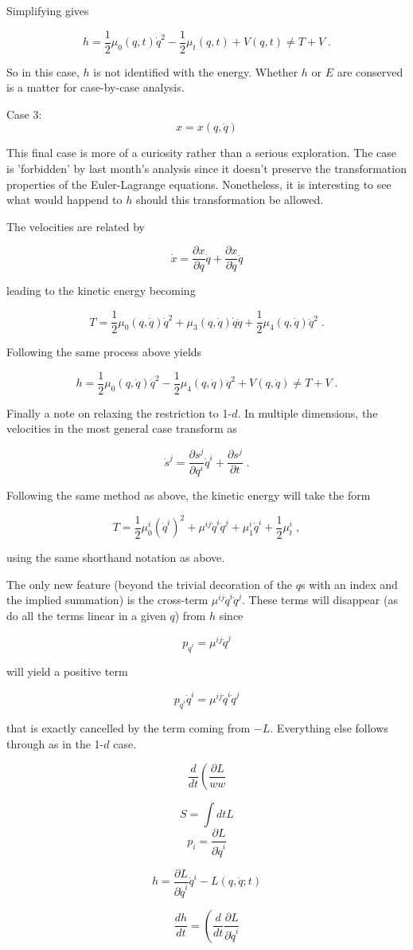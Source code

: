 \documentclass[12pt]{article}
\begin{document}
Simplifying gives 

\[ h =  \frac{1}{2} \mu_0(q,t){\dot q}^2 - \frac{1}{2} \mu_t(q,t) + V(q,t) \neq T + V \; .\]

So in this case, $h$ is not identified with the energy.  Whether $h$ or $E$ are conserved is a matter for case-by-case analysis.

Case 3:  \[ x = x(q,{\dot q}) \]

This final case is more of a curiosity rather than a serious exploration.  The case is 'forbidden' by last month's analysis since it doesn't preserve the transformation properties of the Euler-Lagrange equations.  Nonetheless, it is interesting to see what would happend to $h$ should this transformation be allowed.

The velocities are related by

\[ {\dot x} =  \frac{\partial x}{\partial q} {\dot q} + \frac{\partial x}{\partial {\dot q}} {\ddot q} \]

leading to the kinetic energy becoming 

\[ T = \frac{1}{2} \mu_0(q,{\dot q}) {\dot q}^2 + \mu_3(q,{\dot q}) {\dot q}{\ddot q} + \frac{1}{2} \mu_4(q,{\dot q}) {\ddot q}^2 \; .\]

Following the same process above yields

\[ h = \frac{1}{2} \mu_0(q,{\dot q}) {\dot q}^2 - \frac{1}{2} \mu_4(q,{\dot q}) {\ddot q}^2 + V(q,{\dot q}) \neq T + V \; .\]

Finally a note on relaxing the restriction to 1-$d$.  In multiple dimensions, the velocities in the most general case transform as

\[ {\dot s}^j = \frac{\partial s^j}{\partial q^i} {\dot q}^i + \frac{\partial s^j}{\partial t} \; .\]

Following the same method as above, the kinetic energy will take the form

\[ T = \frac{1}{2} \mu_0^i ({\dot q}^i)^2 + \mu^{ij} {\dot q}^i {\dot q}^j + \mu_1^i {\dot q}^i + \frac{1}{2} \mu_t^i \; ,\]

using the same shorthand notation as above.

The only new feature (beyond the trivial decoration of the $q$s with an index and the implied summation) is the cross-term $\mu^{ij} {\dot q}^i {\dot q}^j$.  These terms will disappear (as do all the terms linear in a given $q$) from $h$ since

\[ p_{{\dot q}^i} = \mu^{ij} {\dot q}^j \]

will yield a positive term

\[ p_{{\dot q}^i} {\dot q}^i =  \mu^{ij} {\dot q}^i {\dot q}^j \] 

that is exactly cancelled by the term coming from $-L$.  Everything else follows through as in the 1-$d$ case.

\[ \frac{d}{dt} \left( \frac{\partial L}{ww} \right.\]

\[ S = \int dt L \] 
\[ p_i = \frac{\partial L}{\partial {\dot q}^i} \]

\[ h = \frac{\partial L}{\partial {\dot q}^i} {\dot q}^i - L(q,\dot q;t) \]

\[ \frac{d h}{dt} = \left( \frac{d}{dt} \frac{\partial L}{\partial {\dot q}^i} \right. \]
\end{document}
